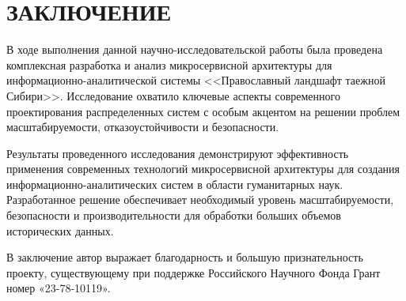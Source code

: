 \chapter*{ЗАКЛЮЧЕНИЕ}     %


В ходе выполнения данной научно-исследовательской работы была проведена комплексная разработка и анализ микросервисной архитектуры для информационно-аналитической системы <<Православный ландшафт таежной Сибири>>. Исследование охватило ключевые аспекты современного проектирования распределенных систем с особым акцентом на решении проблем масштабируемости, отказоустойчивости и безопасности.


Результаты проведенного исследования демонстрируют эффективность применения современных технологий микросервисной архитектуры для создания информационно-аналитических систем в области гуманитарных наук. Разработанное решение обеспечивает необходимый уровень масштабируемости, безопасности и производительности для обработки больших объемов исторических данных.

В заключение автор выражает благодарность и большую признательность проекту, существующему при поддержке Российского Научного
Фонда Грант номер «23-78-10119».
